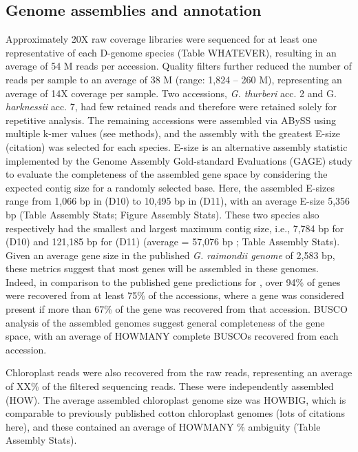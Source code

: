 \documentclass{bmcart}
\newcommand{\note}[2][]{\added[id=#1,remark={#2}]{}}
\begin{document}
\subsection*{Genome assemblies and annotation}
Approximately 20X raw coverage libraries \note[Corrinne]{update numbers} were sequenced for at least one representative of each D-genome species (Table WHATEVER), resulting in an average of 54 M \note[Corrinne]{update numbers} reads per accession. Quality filters further reduced the number of reads per sample to an average of 38 M (range: 1,824 – 260 M\note[Corrinne]{update numbers}), representing an average of 14X coverage per sample\note[Corrinne]{update numbers}. Two accessions, \textit{G. thurberi} acc. 2 and G. \textit{harknessii} acc. 7, had few retained reads and therefore were retained solely for repetitive analysis.  The remaining accessions were assembled via ABySS using multiple k-mer values (see methods), and the assembly with the greatest E-size (citation) was selected for each species. E-size is an alternative assembly statistic implemented by the Genome Assembly Gold-standard Evaluations (GAGE) study to evaluate the completeness of the assembled gene space by considering the expected contig size for a randomly selected base. Here, the assembled E-sizes range from 1,066 bp in (D10) \note[Corrinne]{update now that D10 has better sequence} to 10,495 bp in (D11), with an average E-size 5,356 bp (Table Assembly Stats; Figure Assembly Stats). These two species also respectively had the smallest and largest maximum contig size, i.e., 7,784 bp for (D10) \note[Corrinne]{update} and 121,185 bp for (D11) (average = 57,076 bp \note[Corrinne]{update numbers}; Table Assembly Stats). Given an average gene size in the published \textit{G. raimondii genome} of 2,583 bp, these metrics suggest that most genes will be assembled in these genomes. Indeed, in comparison to the published gene predictions for \note[Corrinne]{update numbers}, over 94\% of genes were recovered from at least 75\% of the accessions, where a gene was considered present if more than 67\% of the gene was recovered from that accession. BUSCO analysis of the assembled genomes suggest general completeness of the gene space, with an average of HOWMANY complete BUSCOs recovered from each accession.

Chloroplast reads were also recovered from the raw reads, representing an average of XX\% \note[Corrinne]{include numbers} of the filtered sequencing reads.  These were independently assembled (HOW). The average assembled chloroplast genome size was HOWBIG, which is comparable to previously published cotton chloroplast genomes (lots of citations here), and these contained an average of HOWMANY \% ambiguity \note[Corrinne]{\% N} (Table Assembly Stats).
\end{document}
